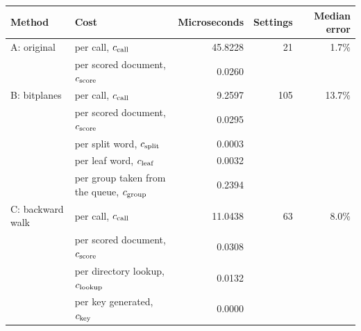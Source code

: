 \begin{tabular}{@{}llrrr@{}}\toprule
Method & Cost & Microseconds & Settings & Median error\\\midrule
A: original & per call, $c_{\rm call}$ & 45.8228 & 21 & 1.7\%\\
 & per scored document, $c_{\rm score}$ & 0.0260 & & \\
B: bitplanes & per call, $c_{\rm call}$ & 9.2597 & 105 & 13.7\%\\
 & per scored document, $c_{\rm score}$ & 0.0295 & & \\
 & per split word, $c_{\rm split}$ & 0.0003 & & \\
 & per leaf word, $c_{\rm leaf}$ & 0.0032 & & \\
 & per group taken from the queue, $c_{\rm group}$ & 0.2394 & & \\
C: backward walk & per call, $c_{\rm call}$ & 11.0438 & 63 & 8.0\%\\
 & per scored document, $c_{\rm score}$ & 0.0308 & & \\
 & per directory lookup, $c_{\rm lookup}$ & 0.0132 & & \\
 & per key generated, $c_{\rm key}$ & 0.0000 & & \\
\bottomrule\end{tabular}
